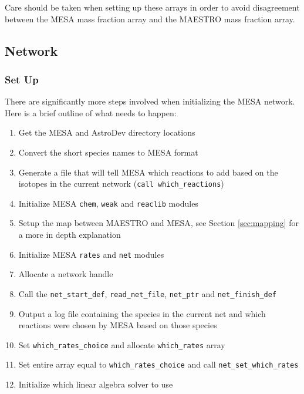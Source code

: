 Care should be taken when setting up these arrays in order to avoid 
disagreement between the {\sf MESA} mass fraction array and the {\sf MAESTRO} 
mass fraction array. 

\subsection{Network}

\subsubsection{Set Up}

There are significantly more steps involved when initializing the {\sf MESA} 
network. Here is a brief outline of what needs to happen:
\begin{enumerate}
\item Get the {\sf MESA} and {\sf AstroDev} directory locations
\item Convert the short species names to {\sf MESA} format
\item Generate a file that will tell {\sf MESA} which reactions to add based 
on the isotopes in the current network ({\tt call which\_reactions})
\item Initialize {\sf MESA} {\tt chem}, {\tt weak} and {\tt reaclib} modules
\item Setup the map between {\sf MAESTRO} and {\sf MESA}, see Section 
\ref{sec:mapping} for a more in depth explanation
\item Initialize {\sf MESA} {\tt rates} and {\tt net} modules
\item Allocate a network handle
\item Call the {\tt net\_start\_def}, {\tt read\_net\_file}, {\tt net\_ptr} 
and {\tt net\_finish\_def}
\item Output a log file containing the species in the current net and which 
reactions were chosen by {\sf MESA} based on those species
\item Set {\tt which\_rates\_choice} and allocate {\tt which\_rates} array
\item Set entire array equal to {\tt which\_rates\_choice} and call 
{\tt net\_set\_which\_rates}
\item Initialize which linear algebra solver to use
\end{enumerate}

